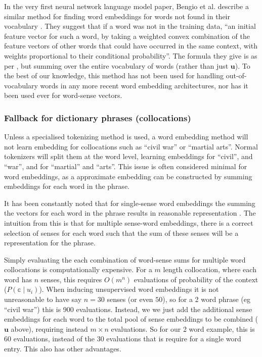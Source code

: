 \documentclass{sig-alternate}
\renewcommand{\u}{\mathbf{u}}
\begin{document}
In the very first neural network language model paper, Bengio et al. describe a similar method for finding word embeddings for words not found in their vocabulary \parencite{NPLM}. They suggest that if a word was not in the training data, \enquote{an initial feature vector for such a word, by taking a weighted convex combination of the feature vectors of other words that could have occurred in the same context, with weights proportional to their conditional probability}. The formula they give is as per , but summing over the entire vocabulary of words (rather than just $\u$). To the best of our knowledge, this method has not been used for handling out-of-vocabulary words in any more recent word embedding architectures, nor has it been used ever for word-sense vectors.


\subsubsection {Fallback for dictionary phrases (collocations)}
Unless a specialised tokenizing method is used, a word embedding method will not learn embedding for collocations such as ``civil war'' or ``martial arts''. Normal tokenizers will split them at the word level, learning embeddings for ``civil'', and ``war'', and for ``martial'' and ``arts''. This issue is often considered minimal for word embeddings, as a approximate embedding can be constructed by summing embeddings for each word  in the phrase.

It has been constantly noted that for single-sense word embeddings the summing the vectors for each word in the phrase results in reasonable representation \parencite{mikolovSkip, White2015SentVecMeaning} . The intuition from this is that for multiple sense-word embeddings, there is a correct selection of senses for each word such that the sum of these senses will be a representation for the phrase.

Simply evaluating the each combination of word-sense sums for multiple word collocations is computationally expensive. For a $m$ length collocation, where each word has $n$ senses, this requires $O(m^n)$ evaluations of probability of the context ($P(\mathbb{c}\mid u_i)$). When inducing unsupervised word embeddings it is not unreasonable to have say $n=30$ senses (or even $50$), so for a 2 word phrase (eg ``civil war'') this is 900 evaluations.
Instead, we we just add the additional sense embeddings for each word to the total pool of sense embeddings to be combined ($\u$ above), requiring instead $m \times n$ evaluations. So for our 2 word example, this is 60 evaluations, instead of the 30 evaluations that is require for a single word entry. This also has other advantages.
\end{document}
